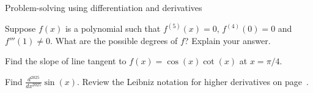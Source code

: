 \documentclass[../main.tex]{subfiles}
\begin{document}
\begin{lesson}{Problem-solving using differentiation and derivatives}
\begin{example}
  \end{example}

  \begin{example}
    Suppose \(f(x)\) is a polynomial such that \(f^{(5)}(x) = 0\), \(f^{(4)}(0) = 0\) and \(f'''(1) \ne 0\). What are the possible degrees of \(f\)? Explain your answer.

  \end{example}
  \clearpage

  \begin{example}
    Find the slope of line tangent to \(f(x) = \cos(x)\cot(x)\) at \(x = \pi/4\). 
  \end{example}

  \begin{example}
    Find \(\frac{d^{2025}}{dx^{2025}} \sin(x)\). Review the Leibniz notation for higher derivatives on page~\pageref{page:higher-derivatives}.

  \end{example}
\end{lesson}
\end{document}

